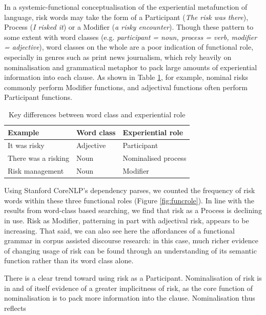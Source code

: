     In a systemic-functional conceptualisation of the experiential metafunction of language, risk words may take the form of a Participant (\emph{The risk was there}), Process (\emph{I risked it}) or a Modifier (\emph{a risky encounter}). Though these pattern to some extent with word classes (e.g. \emph{participant = noun, process = verb, modifier = adjective}), word classes on the whole are a poor indication of functional role, especially in genres such as print news journalism,  which rely heavily on nominalisation and grammatical metaphor to pack large amounts of experiential information into each clause. As shown in Table \ref{tab:class_and_role}, for example, nominal risks commonly perform Modifier functions, and adjectival functions often perform Participant functions.

    \begin{table}
    \small
    \centering
    \begin{tabular}{|l|l|l|}
    \hline
    \textbf{Example}       & \textbf{Word class}     & \textbf{Experiential role}     \\ \hline
    It was risky  & Adjective  &  Participant   \\ \hline
    There was a risking & Noun  &  Nominalised process   \\ \hline
    Risk management  & Noun & Modifier   \\ \hline
    \end{tabular}
    \caption{Key differences between word class and experiential role}
    \label{tab:class_and_role}
    \end{table}

    Using Stanford CoreNLP's dependency parses, we counted the frequency of risk words within these three functional roles (Figure \ref{fig:funcrole}). In line with the results from word-class based searching, we find that risk as a Process is declining in use. Risk as Modifier, patterning in part with adjectival risk, appears to be increasing. That said, we can also see here the affordances of a functional grammar in corpus assisted discourse research: in this case, much richer evidence of changing usage of risk can be found through an understanding of its semantic function rather than its word class alone.


    There is a clear trend toward using risk as a Participant.
    Nominalisation of risk is in and of itself evidence of a greater implicitness of risk, as the core function of nominalisation is to pack more information into the clause. Nominalisation thus reflects 


